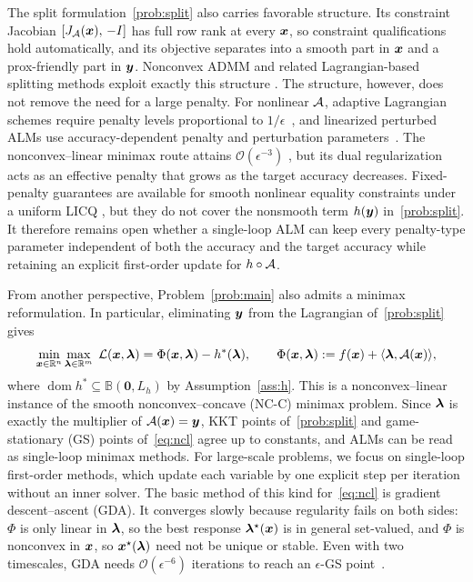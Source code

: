 The split formulation~\eqref{prob:split} also carries favorable structure. Its
constraint Jacobian $[J_{\mathcal{A}}(\bm{x}),\,-I]$ has full row rank at every $\bm{x}$, so
constraint qualifications hold automatically, and its objective separates into a
smooth part in $\bm{x}$ and a prox-friendly part in $\bm{y}$. Nonconvex ADMM and related
Lagrangian-based splitting methods exploit exactly this structure
\cite{bot2020proximal,cohen2022dynamic,hallak2023adaptive,elbourkhissi2025perturbed}.
The structure, however, does not remove the need for a large penalty. For nonlinear
$\mathcal{A}$, adaptive Lagrangian schemes require penalty levels proportional to
$1/\epsilon$~\cite{hallak2023adaptive}, and linearized perturbed ALMs use
accuracy-dependent penalty and perturbation parameters~\cite{elbourkhissi2025perturbed}.
The nonconvex--linear minimax route attains $\mathcal O(\epsilon^{-3})$
\cite{pan2021efficient,he2024approximation,xu2026rada}, but its dual regularization
acts as an effective penalty that grows as the target accuracy decreases. Fixed-penalty
guarantees are available for smooth nonlinear equality constraints under a uniform LICQ
\cite{elbourkhissi2025linearized,liu2026fixed}, but they do not cover the nonsmooth
term $h(\bm{y})$ in~\eqref{prob:split}. It therefore remains open whether a single-loop
ALM can keep every penalty-type parameter independent of both the accuracy
and the target accuracy while retaining an explicit first-order update for
$h\circ\mathcal{A}$.

From another perspective, Problem~\eqref{prob:main} also admits a minimax reformulation. In particular, eliminating $\bm{y}$ from the Lagrangian of~\eqref{prob:split} gives
\begin{equation}\label{eq:ncl}
  \min_{\bm{x}\in\mathbb{R}^n}\max_{\bm{\lambda}\in\mathbb{R}^m}\;
  \mathcal{L}(\bm{x},\bm{\lambda}) =  \Phi(\bm{x},\bm{\lambda})-h^*(\bm{\lambda}), \qquad \Phi(\bm{x},\bm{\lambda}):=f(\bm{x})+\langle\bm{\lambda},\mathcal{A}(\bm{x})\rangle,
\end{equation}
where $\operatorname{dom}h^*\subseteq\mathbb B(\mathbf 0,L_h)$ by
Assumption~\ref{ass:h}. This is a nonconvex--linear instance of the smooth
nonconvex--concave (NC-C) minimax problem. Since $\bm{\lambda}$ is exactly the multiplier of $\mathcal{A}(\bm{x})=\bm{y}$, KKT points
of~\eqref{prob:split} and game-stationary (GS) points of~\eqref{eq:ncl} agree up to
constants, and ALMs can be read as single-loop minimax methods. 
For large-scale problems, we focus on single-loop first-order methods, which
update each variable by one explicit step per iteration without an inner
solver. The basic method of this kind for~\eqref{eq:ncl} is gradient
descent--ascent (GDA). It converges slowly because regularity fails on both
sides: $\Phi$ is only linear in $\bm{\lambda}$, so the best response
$\bm{\lambda}^\star(\bm{x})$ is in general set-valued, and $\Phi$ is nonconvex in $\bm{x}$,
so $\bm{x}^\star(\bm{\lambda})$ need not be unique or stable. Even with two timescales,
GDA needs $\mathcal O(\epsilon^{-6})$ iterations to reach an $\epsilon$-GS
point~\cite{lin2020gradient}.

